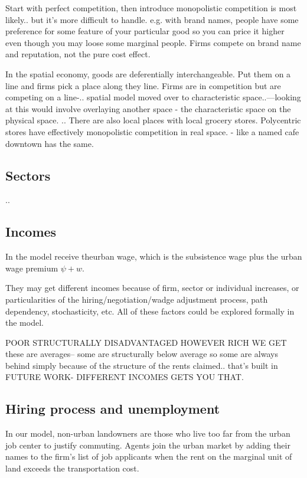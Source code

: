 Start with perfect competition, then introduce monopolistic competition is most likely.. but it's more difficult to handle. e.g. with brand names, people have some preference for some feature of your particular good so you can price it higher even though you may loose some marginal people. Firms compete on brand name and reputation, not the pure cost effect.

In the spatial economy, goods are deferentially interchangeable. Put them on a line and firms pick a place along they line. Firms are in competition but are competing on a line-.. spatial model moved over to characteristic space..---looking at this would involve overlaying another space - the characteristic space on the physical space. .. There are also local places with local grocery stores. Polycentric stores have effectively monopolistic competition in real space. - like a named cafe downtown has the same.

\subsection{Sectors}
..


\subsection{Incomes}
In the model receive the\gls{urban wage}, which is the subsistence wage plus the urban wage premium $\psi + w$.

They may get different incomes because of firm, sector or individual increases, or particularities of the 
hiring/negotiation/wadge adjustment process, path dependency, stochasticity, etc. 
All of these factors could be explored formally in the model. %


POOR STRUCTURALLY DISADVANTAGED HOWEVER RICH WE GET
these are averages-- some are structurally below average so some are always behind simply because of the structure of the rents claimed.. that's built in FUTURE WORK- DIFFERENT INCOMES GETS YOU THAT. 



\subsection{Hiring process and unemployment} \label{section-rockefeller}
 In our model, non-urban landowners are those who live too far from the urban job center to justify commuting.  Agents join the urban market by adding their names to the firm's list of job applicants when the rent on the marginal unit of land exceeds the transportation cost. 


